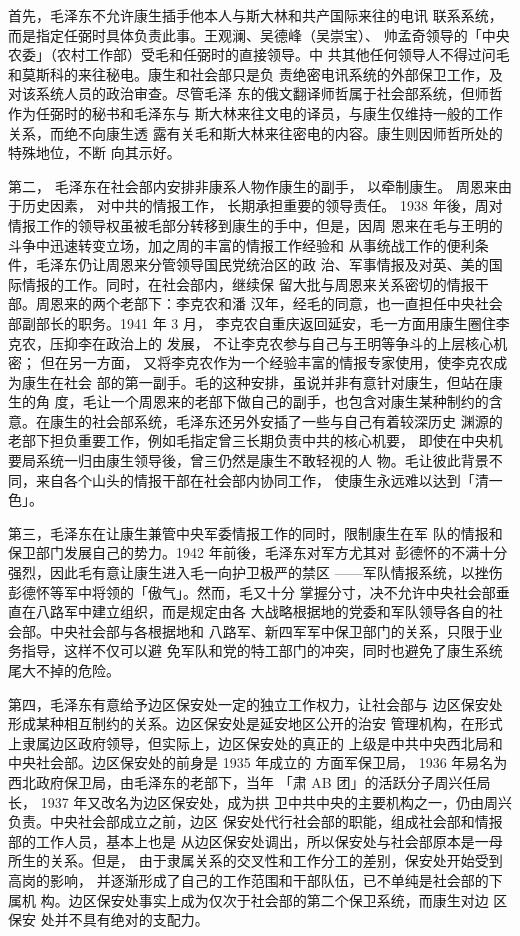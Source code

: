 首先，毛泽东不允许康生插手他本人与斯大林和共产国际来往的电讯
联系系统，而是指定任弼时具体负责此事。王观澜、吴德峰（吴崇宝）、
帅孟奇领导的「中央农委」（农村工作部）受毛和任弼时的直接领导。中
共其他任何领导人不得过问毛和莫斯科的来往秘电。康生和社会部只是负
责绝密电讯系统的外部保卫工作，及对该系统人员的政治审查。尽管毛泽
东的俄文翻译师哲属于社会部系统，但师哲作为任弼时的秘书和毛泽东与
斯大林来往文电的译员，与康生仅维持一般的工作关系，而绝不向康生透
露有关毛和斯大林来往密电的内容。康生则因师哲所处的特殊地位，不断
向其示好。

第二，
毛泽东在社会部内安排非康系人物作康生的副手，
以牵制康生。
周恩来由于历史因素，
对中共的情报工作，
长期承担重要的领导责任。
1938
年後，周对情报工作的领导权虽被毛部分转移到康生的手中，但是，因周
恩来在毛与王明的斗争中迅速转变立场，加之周的丰富的情报工作经验和
从事统战工作的便利条件，毛泽东仍让周恩来分管领导国民党统治区的政
治、军事情报及对英、美的国际情报的工作。同时，在社会部内，继续保
留大批与周恩来关系密切的情报干部。周恩来的两个老部下：李克农和潘
汉年，经毛的同意，也一直担任中央社会部副部长的职务。1941 年 3 月，
李克农自重庆返回延安，毛一方面用康生圈住李克农，压抑李在政治上的
发展，
不让李克农参与自己与王明等争斗的上层核心机密；
但在另一方面，
又将李克农作为一个经验丰富的情报专家使用，使李克农成为康生在社会
部的第一副手。毛的这种安排，虽说并非有意针对康生，但站在康生的角
度，毛让一个周恩来的老部下做自己的副手，也包含对康生某种制约的含
意。在康生的社会部系统，毛泽东还另外安插了一些与自己有着较深历史
渊源的老部下担负重要工作，例如毛指定曾三长期负责中共的核心机要，
即使在中央机要局系统一归由康生领导後，曾三仍然是康生不敢轻视的人
物。毛让彼此背景不同，来自各个山头的情报干部在社会部内协同工作，
使康生永远难以达到「清一色」。

第三，毛泽东在让康生兼管中央军委情报工作的同时，限制康生在军
队的情报和保卫部门发展自己的势力。1942 年前後，毛泽东对军方尤其对
彭德怀的不满十分强烈，因此毛有意让康生进入毛一向护卫极严的禁区
——军队情报系统，以挫伤彭德怀等军中将领的「傲气」。然而，毛又十分
掌握分寸，决不允许中央社会部垂直在八路军中建立组织，而是规定由各
大战略根据地的党委和军队领导各自的社会部。中央社会部与各根据地和
八路军、新四军军中保卫部门的关系，只限于业务指导，这样不仅可以避
免军队和党的特工部门的冲突，同时也避免了康生系统尾大不掉的危险。

第四，毛泽东有意给予边区保安处一定的独立工作权力，让社会部与
边区保安处形成某种相互制约的关系。边区保安处是延安地区公开的治安
管理机构，在形式上隶属边区政府领导，但实际上，边区保安处的真正的
上级是中共中央西北局和中央社会部。边区保安处的前身是 1935 年成立的
方面军保卫局， 1936 年易名为西北政府保卫局，由毛泽东的老部下，当年
「肃 AB 团」的活跃分子周兴任局长， 1937 年又改名为边区保安处，成为拱
卫中共中央的主要机构之一，仍由周兴负责。中央社会部成立之前，边区
保安处代行社会部的职能，组成社会部和情报部的工作人员，基本上也是
从边区保安处调出，所以保安处与社会部原本是一母所生的关系。但是，
由于隶属关系的交叉性和工作分工的差别，保安处开始受到高岗的影响，
并逐渐形成了自己的工作范围和干部队伍，已不单纯是社会部的下属机
构。边区保安处事实上成为仅次于社会部的第二个保卫系统，而康生对边
区保安 处并不具有绝对的支配力。

